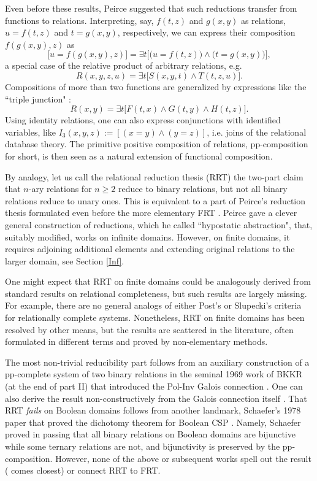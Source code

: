 \documentclass[11pt]{article}
\theoremstyle{plain}
\theoremstyle{definition}
\begin{document}
Even before these results, Peirce suggested that such reductions transfer from functions to relations. Interpreting, say, $f(t,z)$ and $g(x,y)$ as relations, $u=f(t,z)$ and $t=g(x,y)$, respectively, we can express their composition $f(g(x,y),z)$ as
\begin{equation}\label{GraphProd}
\big[u=f(g(x,y),z)\big]=\exists t\big[\big(u=f(t,z)\big)\land\big(t=g(x,y)\big)\big],
\end{equation}
a special case of the relative product of arbitrary relations, e.g.
\begin{equation}\label{RelProd}
R(x,y,z,u)=\exists t\big[S(x,y,t)\land T(t,z,u) \big].
\end{equation}
Compositions of more than two functions are generalized by expressions like the ``triple junction" \cite{Herz}:
\begin{equation}\label{3junc}
R(x,y)=\exists t\big[F(t,x)\land G(t,y)\land H(t,z)\big].
\end{equation}
Using identity relations, one can also express conjunctions with identified variables, like $I_3(x,y,z):=[(x=y)\land(y=z)]$, i.e. joins of the relational database theory. The primitive positive composition of relations, pp-composition for short, is then seen as a natural extension of functional composition.

By analogy, let us call the relational reduction thesis (RRT) the two-part claim that $n$-ary relations for $n\geq2$ reduce to binary relations, but not all binary relations reduce to unary ones. This is equivalent to a part of Peirce's reduction thesis formulated even before the more elementary FRT \cite{Kosh22}. Peirce gave a clever general construction of reductions, which he called ``hypostatic abstraction", that, suitably modified, works on infinite domains. However, on finite domains, it requires adjoining additional elements and extending original relations to the larger domain, see Section \ref{Inf}.

One might expect that RRT on finite domains could be analogously derived from standard results on relational completeness, but such results are largely missing. For example, there are no general analogs of either Post's or Slupecki's criteria \cite{Ros77} for relationally complete systems. Nonetheless, RRT on finite domains has been resolved by other means, but the results are scattered in the literature, often formulated in different terms and proved by non-elementary methods.

The most non-trivial reducibility part follows from an auxiliary construction of a pp-complete system of two binary relations in the seminal 1969 work of BKKR (at the end of part II) that introduced the Pol-Inv Galois connection \cite{BKKR}. One can also derive the result non-constructively from the Galois connection itself \cite[1.1.22]{PosKal}. That RRT {\it fails} on Boolean domains follows from another landmark, Schaefer's 1978 paper that proved the dichotomy theorem for Boolean CSP \cite{Sch78}. Namely, Schaefer proved in passing that all binary relations on Boolean domains are bijunctive while some ternary relations are not, and bijunctivity is preserved by the pp-composition. However, none of the above or subsequent works spell out the result (\cite{HerPos04} comes closest) or connect RRT to FRT.
\end{document}
